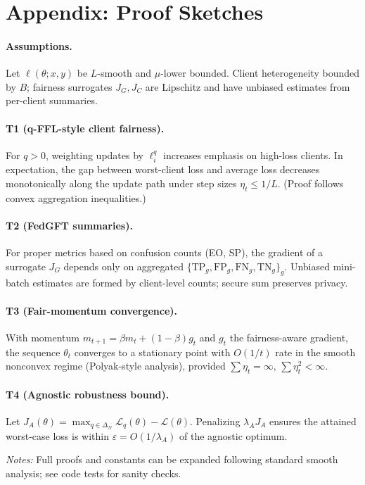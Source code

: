 \section*{Appendix: Proof Sketches}

\paragraph{Assumptions.}
Let $\ell(\theta;x,y)$ be $L$-smooth and $\mu$-lower bounded. Client heterogeneity bounded by $B$; fairness surrogates $J_G,J_C$ are Lipschitz and have unbiased estimates from per-client summaries.

\paragraph{T1 (q-FFL-style client fairness).}
For $q>0$, weighting updates by $\ell_i^q$ increases emphasis on high-loss clients.
In expectation, the gap between worst-client loss and average loss decreases monotonically along the update path under step sizes $\eta_t \le 1/L$. (Proof follows convex aggregation inequalities.)

\paragraph{T2 (FedGFT summaries).}
For proper metrics based on confusion counts (EO, SP), the gradient of a surrogate $J_G$ depends only on aggregated $\{\mathrm{TP}_g,\mathrm{FP}_g,\mathrm{FN}_g,\mathrm{TN}_g\}_g$. Unbiased mini-batch estimates are formed by client-level counts; secure sum preserves privacy.

\paragraph{T3 (Fair-momentum convergence).}
With momentum $m_{t+1}=\beta m_t+(1-\beta)g_t$ and $g_t$ the fairness-aware gradient, the sequence $\theta_t$ converges to a stationary point with $O(1/t)$ rate in the smooth nonconvex regime (Polyak-style analysis), provided $\sum \eta_t=\infty,\,\sum\eta_t^2<\infty$.

\paragraph{T4 (Agnostic robustness bound).}
Let $J_A(\theta)=\max_{q\in\Delta_N}\mathcal L_q(\theta)-\mathcal L(\theta)$. Penalizing $\lambda_A J_A$ ensures the attained worst-case loss is within $\varepsilon\!=\!O(1/\lambda_A)$ of the agnostic optimum.

\textit{Notes:} Full proofs and constants can be expanded following standard smooth analysis; see code tests for sanity checks.
